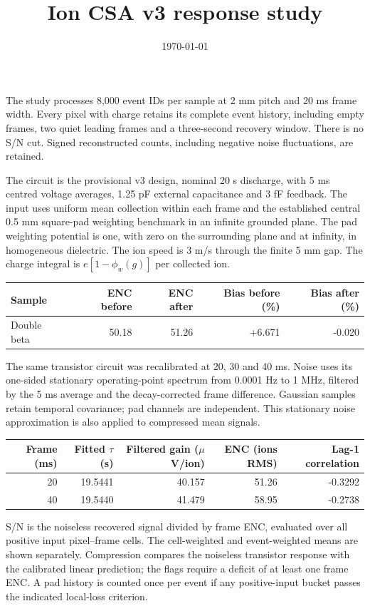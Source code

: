 \documentclass[10pt,a4paper]{article}
\title{Ion CSA v3 response study}
\date{\today}
\begin{document}
\maketitle
The study processes 8,000 event IDs per sample at 2 mm pitch
and 20 ms frame width. Every pixel with charge retains its
complete event history, including empty frames, two quiet leading frames and a
three-second recovery window. There is no S/N cut. Signed reconstructed counts,
including negative noise fluctuations, are retained.

The circuit is the provisional v3 design, nominal 20 s discharge, with 5 ms
centred voltage averages, 1.25 pF external capacitance and 3 fF feedback. The input
uses uniform mean collection within each frame and the established central
0.5 mm square-pad weighting benchmark in an infinite grounded plane. The pad
weighting potential is one, with zero on the surrounding plane and at infinity,
in homogeneous dielectric. The ion speed is 3 m/s through the finite 5 mm gap.
The charge integral is $e[1-\phi_w(g)]$ per collected ion.

\begin{center}\small\begin{tabular}{lrrrr}\toprule Sample & ENC before & ENC after & Bias before (\%) & Bias after (\%)\\\midrule
Double beta & 50.18 & 51.26 & +6.671 & -0.020 \\\bottomrule\end{tabular}\end{center}

The same transistor circuit was recalibrated at 20, 30 and 40 ms. Noise uses its
one-sided stationary operating-point spectrum from 0.0001 Hz to 1 MHz, filtered
by the 5 ms average and the decay-corrected frame difference. Gaussian samples
retain temporal covariance; pad channels are independent. This stationary noise
approximation is also applied to compressed mean signals.
\begin{center}\begin{tabular}{rrrrr}\toprule
Frame (ms) & Fitted $\tau$ (s) & Filtered gain ($\mu$V/ion) & ENC (ions RMS) & Lag-1 correlation\\\midrule
20 & 19.5441 & 40.157 & 51.26 & -0.3292 \\
40 & 19.5440 & 41.479 & 58.95 & -0.2738 \\
\bottomrule\end{tabular}\end{center}

S/N is the noiseless recovered signal divided by frame ENC, evaluated over all
positive input pixel--frame cells. The cell-weighted and event-weighted means
are shown separately. Compression compares the noiseless transistor response
with the calibrated linear prediction; the flags require a deficit of at least
one frame ENC. A pad history is counted once per event if any positive-input
bucket passes the indicated local-loss criterion.
\end{document}
